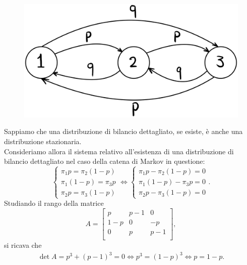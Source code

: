 \documentclass[12pt]{homework}
\begin{document}
\section{}%
 \begin{figure}[htb]\centering
\includegraphics[scale=0.09]{Catena4.eps}
  \end{figure}
  Sappiamo che una distribuzione di bilancio dettagliato, se esiste, è anche una distribuzione stazionaria.\\
  Consideriamo allora il sistema relativo all'esistenza di una distribuzione di bilancio dettagliato nel caso della catena di Markov in questione:
  \begin{equation*}
  \begin{cases}\pi_{1}p=\pi_{2}\left(1-p\right)\\\pi_{1}\left(1-p\right)=\pi_{3}p\\\pi_{2}p=\pi_{3}\left(1-p\right)\end{cases}\Leftrightarrow\begin{cases}\pi_{1}p-\pi_{2}\left(1-p\right)=0\\\pi_{1}\left(1-p\right)-\pi_{3}p=0\\\pi_{2}p-\pi_{3}\left(1-p\right)=0\end{cases}.
  \end{equation*}
  Studiando il rango della matrice
  \begin{equation*}
  A=\begin{bmatrix}
  p & p-1 & 0\\
  1-p & 0 & -p \\
  0 & p & p-1\\
  \end{bmatrix},
  \end{equation*}
 si ricava che
 \begin{gather*}
 \det A=p^{3}+\left(p-1\right)^{3}=0\Leftrightarrow p^{3}=\left(1-p\right)^{3}\Leftrightarrow p=1-p.
 \end{gather*}
\end{document}
